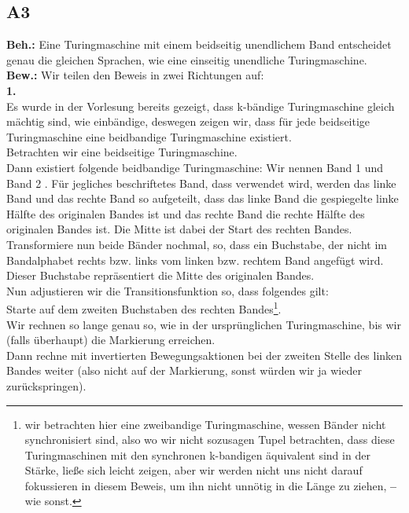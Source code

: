 \documentclass[12pt, a4paper]{article}
\newcommand*{\gedanke}{\textbf{-- }}
\newcommand*{\gap}{\text{ }}
\newcommand*{\beh}{\textbf{Beh.:} \gap}
\newcommand*{\bew}{\textbf{Bew.:} \gap}
\begin{document}
\subsection*{A3}
\beh Eine Turingmaschine mit einem beidseitig unendlichem Band entscheidet genau die gleichen Sprachen, wie eine einseitig unendliche Turingmaschine. \\
\bew Wir teilen den Beweis in zwei Richtungen auf: \\
\textbf{1. } \textquote{\(\Rightarrow\)} \\
Es wurde in der Vorlesung bereits gezeigt, dass k-bändige Turingmaschine gleich mächtig sind, wie einbändige, deswegen zeigen wir, dass für jede beidseitige Turingmaschine eine beidbandige Turingmaschine existiert. \\
Betrachten wir eine beidseitige Turingmaschine. \\
Dann existiert folgende beidbandige Turingmaschine: Wir nennen Band 1  und Band 2 . Für jegliches beschriftetes Band, dass verwendet wird, werden das linke Band und das rechte Band so aufgeteilt, dass das linke Band die gespiegelte linke Hälfte des originalen Bandes ist und das rechte Band die rechte Hälfte des originalen Bandes ist. Die Mitte ist dabei der Start des rechten Bandes.\\
Transformiere nun beide Bänder nochmal, so, dass ein Buchstabe, der nicht im Bandalphabet rechts bzw. links vom linken bzw. rechtem Band angefügt wird. Dieser Buchstabe repräsentiert die Mitte des originalen Bandes. \\
Nun adjustieren wir die Transitionsfunktion so, dass folgendes gilt:\\
Starte auf dem zweiten Buchstaben des rechten Bandes\footnote[1]{wir betrachten hier eine zweibandige Turingmaschine, wessen Bänder nicht synchronisiert sind, also wo wir nicht sozusagen Tupel betrachten, dass diese Turingmaschinen mit den synchronen k-bandigen äquivalent sind in der Stärke, ließe sich leicht zeigen, aber wir werden nicht uns nicht darauf fokussieren in diesem Beweis, um ihn nicht unnötig in die Länge zu ziehen, \gedanke wie sonst.}.\\
Wir rechnen so lange genau so, wie in der ursprünglichen Turingmaschine, bis wir (falls überhaupt) die Markierung erreichen. \\
Dann rechne mit invertierten Bewegungsaktionen bei der zweiten Stelle des linken Bandes weiter (also nicht auf der Markierung, sonst würden wir ja wieder zurückspringen).\\
\end{document}
